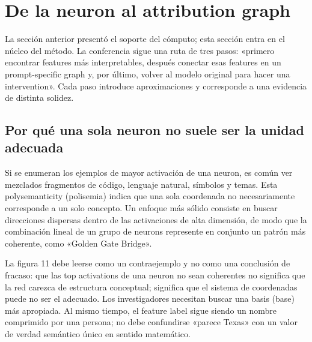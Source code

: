 \section{De la neuron al attribution graph}

La sección anterior presentó el soporte del cómputo; esta sección entra en el núcleo del método. La conferencia sigue una ruta de tres pasos: «primero encontrar features más interpretables, después conectar esas features en un prompt-specific graph y, por último, volver al modelo original para hacer una intervention». Cada paso introduce aproximaciones y corresponde a una evidencia de distinta solidez.

\subsection{Por qué una sola neuron no suele ser la unidad adecuada}

Si se enumeran los ejemplos de mayor activación de una neuron, es común ver mezclados fragmentos de código, lenguaje natural, símbolos y temas. Esta polysemanticity (polisemia) indica que una sola coordenada no necesariamente corresponde a un solo concepto. Un enfoque más sólido consiste en buscar direcciones dispersas dentro de las activaciones de alta dimensión, de modo que la combinación lineal de un grupo de neurons represente en conjunto un patrón más coherente, como «Golden Gate Bridge».



La figura 11 debe leerse como un contraejemplo y no como una conclusión de fracaso: que las top activations de una neuron no sean coherentes no significa que la red carezca de estructura conceptual; significa que el sistema de coordenadas puede no ser el adecuado. Los investigadores necesitan buscar una basis (base) más apropiada. Al mismo tiempo, el feature label sigue siendo un nombre comprimido por una persona; no debe confundirse «parece Texas» con un valor de verdad semántico único en sentido matemático.


